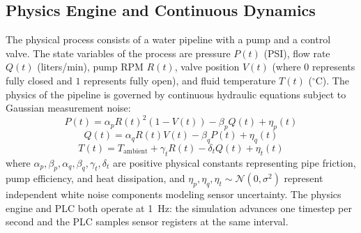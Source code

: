 \documentclass[journal,twoside,web]{ieeecolor}
\begin{document}
\subsection{Physics Engine and Continuous Dynamics}
The physical process consists of a water pipeline with a pump and a control valve. The state variables of the process are pressure $P(t)$ (PSI), flow rate $Q(t)$ (liters/min), pump RPM $R(t)$, valve position $V(t)$ (where $0$ represents fully closed and $1$ represents fully open), and fluid temperature $T(t)$ ($^\circ$C). The physics of the pipeline is governed by continuous hydraulic equations subject to Gaussian measurement noise:
\begin{equation}
P(t) = \alpha_p R(t)^2 (1 - V(t)) - \beta_p Q(t) + \eta_p(t)
\label{eq:pressure}
\end{equation}
\begin{equation}
Q(t) = \alpha_q R(t) V(t) - \beta_q P(t) + \eta_q(t)
\label{eq:flow}
\end{equation}
\begin{equation}
T(t) = T_{\text{ambient}} + \gamma_t R(t) - \delta_t Q(t) + \eta_t(t)
\label{eq:temp}
\end{equation}
where $\alpha_p, \beta_p, \alpha_q, \beta_q, \gamma_t, \delta_t$ are positive physical constants representing pipe friction, pump efficiency, and heat dissipation, and $\eta_p, \eta_q, \eta_t \sim \mathcal{N}(0, \sigma^2)$ represent independent white noise components modeling sensor uncertainty. The physics engine and PLC both operate at 1~Hz: the simulation advances one timestep per second and the PLC samples sensor registers at the same interval.
\end{document}
